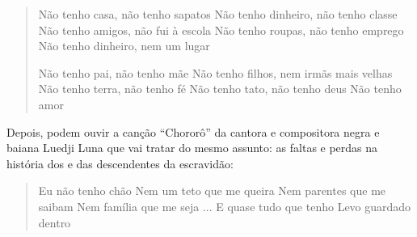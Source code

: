\documentclass[11pt]{extarticle}
\begin{document}
\begin{verse}Não tenho casa, não tenho sapatos
Não tenho dinheiro, não tenho classe
Não tenho amigos, não fui à escola
Não tenho roupas, não tenho emprego
Não tenho dinheiro, nem um lugar

Não tenho pai, não tenho mãe
Não tenho filhos, nem irmãs mais velhas
Não tenho terra, não tenho fé
Não tenho tato, não tenho deus
Não tenho amor
\end{verse}


Depois, podem ouvir a canção ``Chororô'' da cantora e compositora negra e baiana Luedji 
Luna que vai tratar do mesmo assunto: as faltas e perdas na história
dos e das descendentes da escravidão:

\begin{verse}Eu não tenho chão
Nem um teto que me queira
Nem parentes que me saibam
Nem família que me seja
...
E quase tudo que tenho
Levo guardado dentro
\end{verse}

\end{document}
